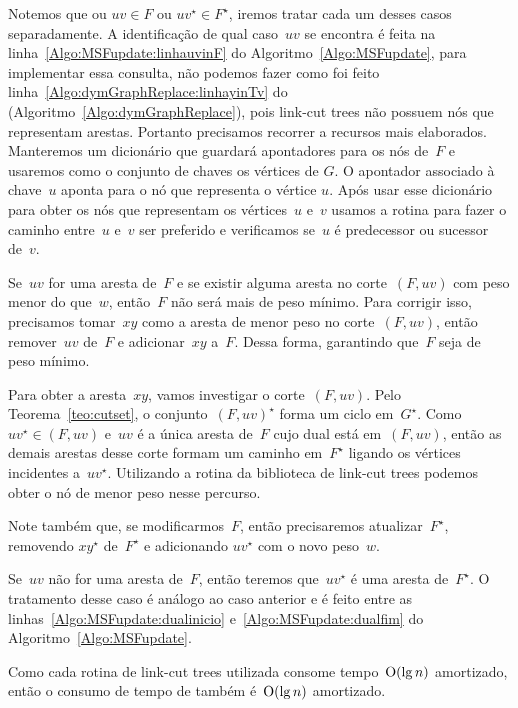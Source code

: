 Notemos que ou $uv\in F$ ou $uv^\star\in F^\star$, iremos tratar cada um desses casos separadamente.
A identificação de qual caso~$uv$ se encontra é feita na linha~\ref{Algo:MSFupdate:linhauvinF} do Algoritmo~\ref{Algo:MSFupdate}, para implementar essa consulta, não podemos fazer como foi feito linha~\ref{Algo:dymGraphReplace:linhayinTv} do \dymGraphReplace(Algoritmo~\ref{Algo:dymGraphReplace}), pois link-cut trees não possuem nós que representam arestas.
Portanto precisamos recorrer a recursos mais elaborados.
Manteremos um dicionário que guardará apontadores para os nós de~$F$ e usaremos como o conjunto de chaves os vértices de $G$. O apontador associado à chave~$u$ aponta para o nó que representa o vértice $u$.
Após usar esse dicionário para obter os nós que representam os vértices~$u$ e~$v$ usamos a rotina \linkcutPath{} para fazer o caminho entre~$u$ e~$v$ ser preferido e verificamos se~$u$ é predecessor ou sucessor de~$v$.

Se~$uv$ for uma aresta de~$F$ e se existir alguma aresta no corte~$(F, uv)$ com peso menor do que~$w$, então~$F$ não será mais de peso mínimo.
Para corrigir isso, precisamos tomar~$xy$ como a aresta de menor peso no corte~$(F, uv)$,
então remover~$uv$ de~$F$ e adicionar~$xy$ a~$F$.
Dessa forma, garantindo que~$F$ seja de peso mínimo.

Para obter a aresta~$xy$, vamos investigar o corte~$(F, uv)$.
Pelo Teorema~\ref{teo:cutset}, o conjunto~$(F, uv)^\star$ forma um ciclo em~$G^\star$.
Como~$uv^\star\in(F, uv)$ e~$uv$ é a única aresta de~$F$ cujo dual está em~$(F, uv)$, então as demais arestas desse corte formam um caminho em~$F^\star$ ligando os vértices incidentes a~$uv^\star$.
Utilizando a rotina \linkcutMin{}  da biblioteca de link-cut trees podemos obter o nó de menor peso nesse percurso.

Note também que, se modificarmos~$F$, então precisaremos atualizar~$F^\star$, removendo $xy^\star$ de~$F^\star$ e adicionando $uv^\star$ com o novo peso~$w$.

Se~$uv$ não for uma aresta de~$F$, então teremos que~$uv^\star$ é uma aresta de~$F^\star$.
O tratamento desse caso é análogo ao caso anterior e é feito entre as linhas~\ref{Algo:MSFupdate:dualinicio} e~\ref{Algo:MSFupdate:dualfim} do Algoritmo~\ref{Algo:MSFupdate}.

Como cada rotina de link-cut trees utilizada consome tempo~$\mathrm{O}(\lg n)$ amortizado, então o consumo de tempo de \MSFupdate{} também é~$\mathrm{O}(\lg n)$ amortizado.




